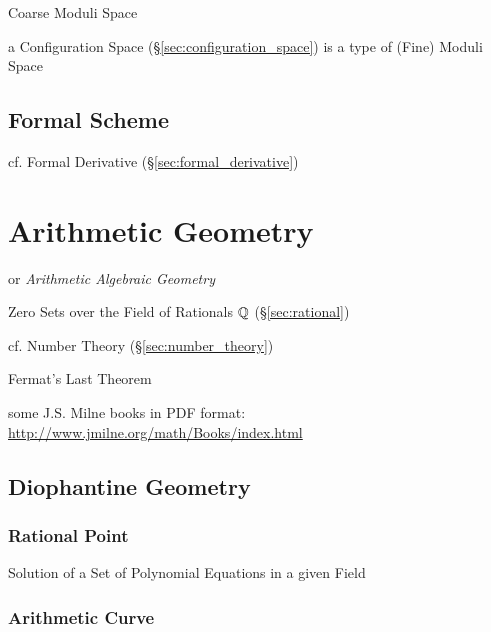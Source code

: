 Coarse Moduli Space

a Configuration Space (\S\ref{sec:configuration_space}) is a type of (Fine)
Moduli Space



\subsection{Formal Scheme}\label{sec:formal_scheme}

cf. Formal Derivative (\S\ref{sec:formal_derivative})



\section{Arithmetic Geometry}\label{sec:arithmetic_geometry}

or \emph{Arithmetic Algebraic Geometry}

Zero Sets over the Field of Rationals $\mathbb{Q}$ (\S\ref{sec:rational})

cf. Number Theory (\S\ref{sec:number_theory})

Fermat's Last Theorem

some J.S. Milne books in PDF format:
\url{http://www.jmilne.org/math/Books/index.html}



\subsection{Diophantine Geometry}\label{sec:diophantine_geometry}

\subsubsection{Rational Point}\label{sec:rational_point}

Solution of a Set of Polynomial Equations in a given Field



\subsubsection{Arithmetic Curve}\label{sec:arithmetic_curve}

